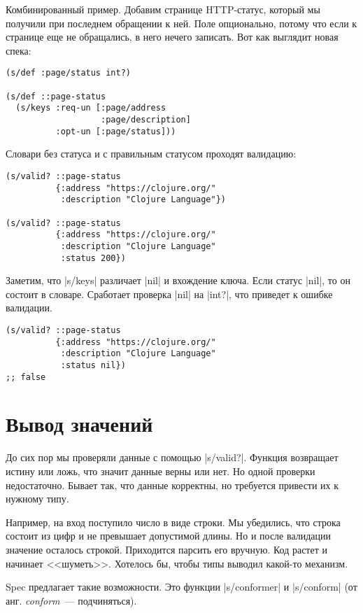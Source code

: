 Комбинированный пример. Добавим странице HTTP-статус, который мы получили при
последнем обращении к ней. Поле опционально, потому что если к странице еще не
обращались, в него нечего записать. Вот как выглядит новая спека:

\begin{verbatim}
(s/def :page/status int?)

(s/def ::page-status
  (s/keys :req-un [:page/address
                   :page/description]
          :opt-un [:page/status]))
\end{verbatim}

Словари без статуса и с правильным статусом проходят валидацию:

\begin{verbatim}
(s/valid? ::page-status
          {:address "https://clojure.org/"
           :description "Clojure Language"})

(s/valid? ::page-status
          {:address "https://clojure.org/"
           :description "Clojure Language"
           :status 200})
\end{verbatim}

Заметим, что \spverb|s/keys| различает \spverb|nil| и вхождение ключа. Если
статус \spverb|nil|, то он состоит в словаре. Сработает проверка \spverb|nil| на
\spverb|int?|, что приведет к ошибке валидации.

\begin{verbatim}
(s/valid? ::page-status
          {:address "https://clojure.org/"
           :description "Clojure Language"
           :status nil})
;; false
\end{verbatim}

\section{Вывод значений}

До сих пор мы проверяли данные с помощью \spverb|s/valid?|. Функция возвращает
истину или ложь, что значит данные верны или нет. Но одной проверки
недостаточно. Бывает так, что данные корректны, но требуется привести их к
нужному типу.

Например, на вход поступило число в виде строки. Мы убедились, что строка
состоит из цифр и не превышает допустимой длины. Но и после валидации значение
осталось строкой. Приходится парсить его вручную. Код растет и начинает
<<шуметь>>. Хотелось бы, чтобы типы выводил какой-то механизм.

Spec предлагает такие возможности. Это функции \spverb|s/conformer| и
\spverb|s/conform| (от анг. \emph{conform}~--- подчиняться).

